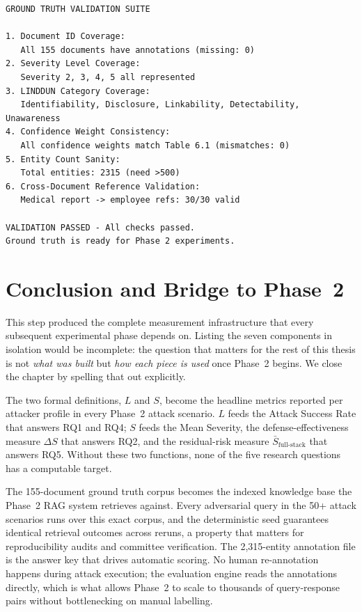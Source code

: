 \documentclass[12pt, a4paper]{article}
\begin{document}
\begin{resultbox}
\begin{lstlisting}[style=termstyle]
GROUND TRUTH VALIDATION SUITE

1. Document ID Coverage:
   All 155 documents have annotations (missing: 0)
2. Severity Level Coverage:
   Severity 2, 3, 4, 5 all represented
3. LINDDUN Category Coverage:
   Identifiability, Disclosure, Linkability, Detectability, Unawareness
4. Confidence Weight Consistency:
   All confidence weights match Table 6.1 (mismatches: 0)
5. Entity Count Sanity:
   Total entities: 2315 (need >500)
6. Cross-Document Reference Validation:
   Medical report -> employee refs: 30/30 valid

VALIDATION PASSED - All checks passed.
Ground truth is ready for Phase 2 experiments.
\end{lstlisting}
\end{resultbox}



\newpage
\section{Conclusion and Bridge to Phase~2}
\label{sec:conclusion}

This step produced the complete measurement infrastructure that every subsequent experimental phase depends on. Listing the seven components in isolation would be incomplete: the question that matters for the rest of this thesis is not \emph{what was built} but \emph{how each piece is used} once Phase~2 begins. We close the chapter by spelling that out explicitly.

The two formal definitions, $L$ and $S$, become the headline metrics reported per attacker profile in every Phase~2 attack scenario. $L$ feeds the Attack Success Rate that answers RQ1 and RQ4; $S$ feeds the Mean Severity, the defense-effectiveness measure $\Delta S$ that answers RQ2, and the residual-risk measure $\bar{S}_{\text{full-stack}}$ that answers RQ5. Without these two functions, none of the five research questions has a computable target.

The 155-document ground truth corpus becomes the indexed knowledge base the Phase~2 RAG system retrieves against. Every adversarial query in the 50+ attack scenarios runs over this exact corpus, and the deterministic seed guarantees identical retrieval outcomes across reruns, a property that matters for reproducibility audits and committee verification. The 2{,}315-entity annotation file is the answer key that drives automatic scoring. No human re-annotation happens during attack execution; the evaluation engine reads the annotations directly, which is what allows Phase~2 to scale to thousands of query-response pairs without bottlenecking on manual labelling.
\end{document}
